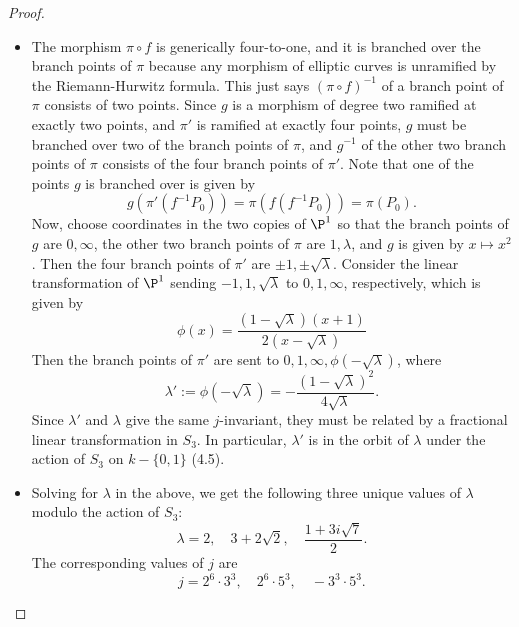 \documentclass[a4paper]{article}
\begin{document}
\begin{enumerate} [label=\textbf{\arabic*.}, leftmargin=0em]
\begin{proof}
\begin{itemize} [leftmargin=0cm]
                  \item[(c)] The morphism $\pi \circ f$ is generically four-to-one, and it is branched over the branch points of $\pi$ because any morphism of elliptic curves is unramified by the Riemann-Hurwitz formula.
                        This just says $(\pi \circ f)^{-1}$ of a branch point of $\pi$ consists of two points.
                        Since $g$ is a morphism of degree two ramified at exactly two points, and $\pi'$ is ramified at exactly four points, $g$ must be branched over two of the branch points of $\pi$, and $g^{-1}$ of the other two branch points of $\pi$ consists of the four branch points of $\pi'$.
                        Note that one of the points $g$ is branched over is given by $$g(\pi'(f^{-1}P_0)) = \pi(f(f^{-1}P_0)) = \pi(P_0).$$
                        Now, choose coordinates in the two copies of $\P^1$ so that the branch points of $g$ are $0, \infty$, the other two branch points of $\pi$ are $1, \lambda$, and $g$ is given by $x \mapsto x^2$.
                        Then the four branch points of $\pi'$ are $\pm 1, \pm \sqrt{\lambda}$.
                        Consider the linear transformation of $\P^1$ sending $-1, 1, \sqrt{\lambda}$ to $0, 1, \infty$, respectively, which is given by
                        \begin{equation*}
                            \phi(x) = \frac{(1 - \sqrt{\lambda})(x + 1)}{2(x - \sqrt{\lambda})}
                        \end{equation*}
                        Then the branch points of $\pi'$ are sent to $0, 1, \infty, \phi(-\sqrt{\lambda})$, where
                        \begin{equation*}
                            \lambda' := \phi(-\sqrt{\lambda}) = -\frac{(1 - \sqrt{\lambda})^2}{4\sqrt{\lambda}}.
                        \end{equation*}
                        Since $\lambda'$ and $\lambda$ give the same $j$-invariant, they must be related by a fractional linear transformation in $S_3$.
                        In particular, $\lambda'$ is in the orbit of $\lambda$ under the action of $S_3$ on $k - \{0, 1\}$ (4.5).

                  \item[(d)] Solving for $\lambda$ in the above, we get the following three unique values of $\lambda$ modulo the action of $S_3$:
                        \begin{equation*}
                            \lambda = 2, \quad 3 + 2\sqrt{2}, \quad \frac{1 + 3i\sqrt{7}}{2}.
                        \end{equation*}
                        The corresponding values of $j$ are
                        \begin{equation*}
                            j = 2^6 \cdot 3^3, \quad 2^6 \cdot 5^3, \quad -3^3 \cdot 5^3.
                        \end{equation*}
              \end{itemize}
          \end{proof}


\end{enumerate}
\end{document}
